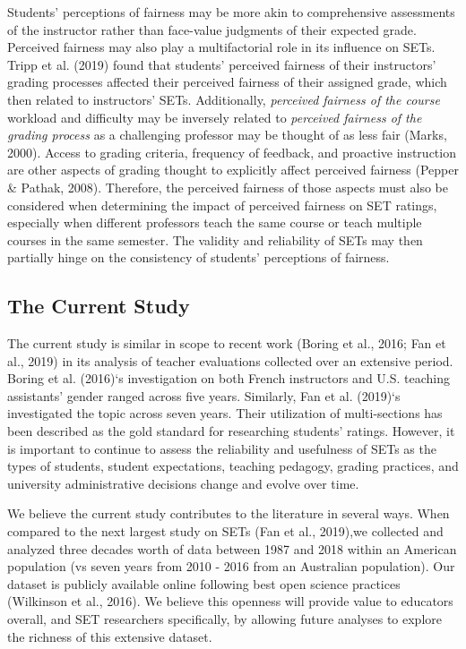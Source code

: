 \documentclass[
  man]{apa7}
\begin{document}
Students' perceptions of fairness may be more akin to comprehensive assessments of the instructor rather than face-value judgments of their expected grade. Perceived fairness may also play a multifactorial role in its influence on SETs. Tripp et al. (2019) found that students' perceived fairness of their instructors' grading processes affected their perceived fairness of their assigned grade, which then related to instructors' SETs. Additionally, \emph{perceived fairness of the course} workload and difficulty may be inversely related to \emph{perceived fairness of the grading process} as a challenging professor may be thought of as less fair (Marks, 2000). Access to grading criteria, frequency of feedback, and proactive instruction are other aspects of grading thought to explicitly affect perceived fairness (Pepper \& Pathak, 2008). Therefore, the perceived fairness of those aspects must also be considered when determining the impact of perceived fairness on SET ratings, especially when different professors teach the same course or teach multiple courses in the same semester. The validity and reliability of SETs may then partially hinge on the consistency of students' perceptions of fairness.

\subsection{The Current Study}\label{the-current-study}

The current study is similar in scope to recent work (Boring et al., 2016; Fan et al., 2019) in its analysis of teacher evaluations collected over an
extensive period. Boring et al. (2016)`s investigation on both French instructors
and U.S. teaching assistants' gender ranged across five years.
Similarly, Fan et al. (2019)`s investigated the topic across seven years. Their
utilization of multi-sections has been described as the gold standard
for researching students' ratings. However, it is important to continue
to assess the reliability and usefulness of SETs as the types of
students, student expectations, teaching pedagogy, grading practices,
and university administrative decisions change and evolve over time.

We believe the current study contributes to the literature in several
ways. When compared to the next largest study on SETs (Fan et al., 2019),we collected and analyzed three decades worth of data between 1987 and 2018 within an American population (vs seven years from 2010 - 2016 from an Australian population). Our dataset is publicly available online following best open science practices (Wilkinson et al., 2016). We believe this openness will provide value to educators
overall, and SET researchers specifically, by allowing future analyses to
explore the richness of this extensive dataset.
\end{document}
